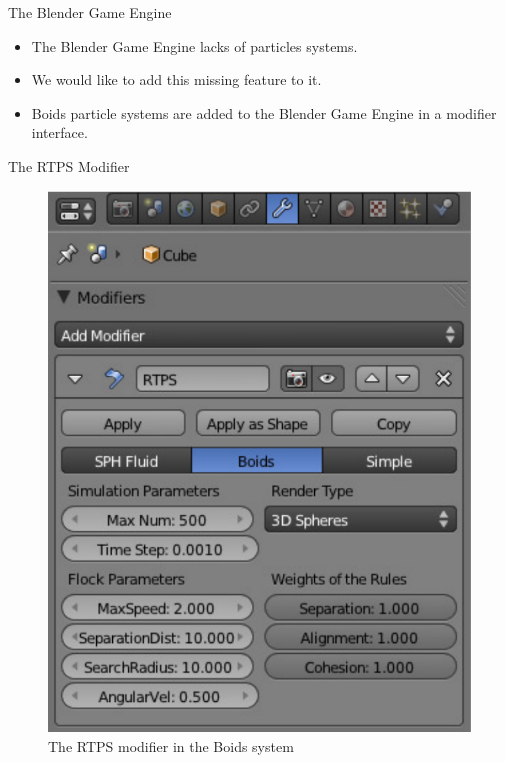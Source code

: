 \documentclass[red]{beamer}
\begin{document}
\begin{frame}{The Blender Game Engine}
	\begin{itemize}
		\pause \item The Blender Game Engine lacks of particles systems.
		\pause \item We would like to add this missing feature to it.
		\pause \item Boids particle systems are added to the Blender Game Engine in a modifier interface.
	\end{itemize}
\end{frame}

\begin{frame}{The RTPS Modifier}
	\begin{figure}[htbp]
	\begin{center}
	\includegraphics[scale=0.35]{../figures/modifier.pdf}
	\caption{The RTPS modifier in the Boids system}
	\end{center}
	\end{figure}
\end{frame}
\end{document}
